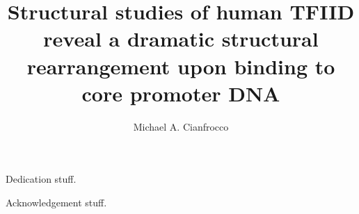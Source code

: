 \documentclass{ucbthesis}
\begin{document}

\title{Structural studies of human TFIID reveal a dramatic structural rearrangement upon binding to core promoter DNA}
\author{Michael A. Cianfrocco}


\maketitle
\approvalpage
\copyrightpage



\begin{frontmatter}

\begin{dedication}
\null\vfil
\begin{center}
Dedication stuff.
\end{center}
\vfil\null
\end{dedication}

\tableofcontents
\clearpage
\listoffigures
\clearpage

\begin{acknowledgements}
Acknowledgement stuff.
\end{acknowledgements}

\end{frontmatter}

\pagestyle{headings}


%
%
%


\appendix



\printnomenclature
\printbibliography
\end{document}
